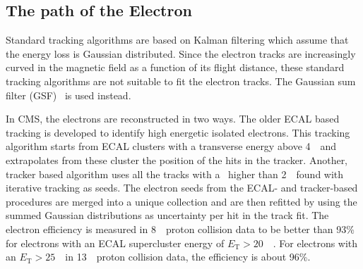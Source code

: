 %


\subsection{The path of the Electron}
\label{sec:ElectronTrack}
 Standard tracking algorithms are based on Kalman filtering which assume that the energy loss is Gaussian distributed. Since the  electron tracks are increasingly curved in the magnetic field as a function of its flight distance, these standard tracking algorithms are not suitable to fit the electron tracks. The Gaussian sum filter (GSF)~\cite{0954-3899-31-9-N01} is used instead. 

In CMS, the electrons are reconstructed in two ways. The older ECAL based tracking is developed to identify high energetic isolated electrons. This tracking algorithm starts from ECAL clusters with a transverse energy above 4~\GeV\ and extrapolates from these cluster the position of the hits in the tracker. Another, tracker based algorithm uses all the tracks with a \pt\ higher than 2~\GeV\ found with iterative tracking as seeds. The electron seeds from the ECAL- and tracker-based procedures are merged into a unique collection and are then refitted  by using the summed Gaussian distributions as uncertainty per hit in the track fit. The electron efficiency is measured in 8~\TeV\ proton collision data to be better than 93\% for electrons with an ECAL supercluster energy of $E_{\mathrm{T}}>20$~\GeV~\cite{1748-0221-10-06-P06005}. For electrons with an  $E_{\mathrm{T}}>25$~\GeV\  in 13~\TeV\ proton collision data, the efficiency is about 96\%\cite{CMS-DP-2017-004}.


